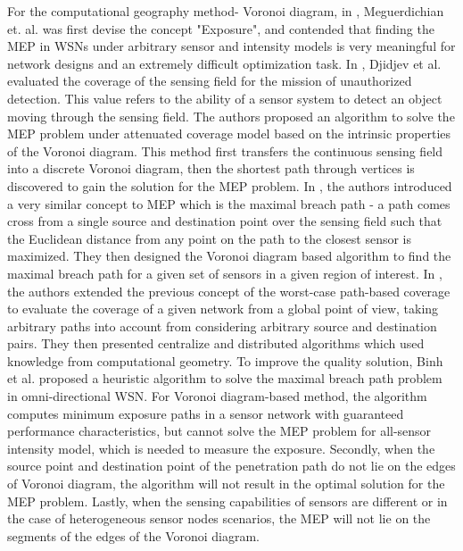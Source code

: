 \documentclass[final]{elsarticle}
\begin{document}
For the computational geography method- Voronoi diagram, in \cite{meguerdichian2001exposure}, Meguerdichian et. al. was first devise the concept "Exposure", and contended that finding the MEP in WSNs under arbitrary sensor and intensity models is very meaningful for network designs and an extremely difficult optimization task. In \cite{djidjev2010approximation}, Djidjev et al. evaluated the coverage of the sensing field for the mission of unauthorized detection. This value refers to the ability of a sensor system to detect an object moving through the sensing field. The authors proposed an algorithm to solve the MEP problem under attenuated coverage model based on the intrinsic properties of the Voronoi diagram. This method first transfers the continuous sensing field into a discrete Voronoi diagram, then the shortest path through vertices is discovered to gain the solution for the MEP problem. In \cite{megerian2005worst}, the authors introduced a very similar concept to MEP which is the maximal breach path - a path comes cross from a single source and destination point over the sensing field such that the Euclidean distance from any point on the path to the closest sensor is maximized. They then designed the Voronoi diagram based algorithm to find the maximal breach path for a given set of sensors in a given region of interest. In \cite{lee2013best}, the authors  extended the previous concept of the worst-case path-based coverage to evaluate the coverage of a given network from a global point of view, taking arbitrary paths into account from considering arbitrary source and destination pairs. They then presented centralize and distributed algorithms which used knowledge from computational geometry. To improve the quality solution, Binh et al. \cite{binh2016heuristic} proposed a heuristic algorithm to solve the maximal breach path problem in omni-directional WSN. For Voronoi diagram-based method, the algorithm computes minimum exposure paths in a sensor network with guaranteed performance
characteristics, but cannot solve the MEP problem for all-sensor intensity model, which is needed to measure the exposure. Secondly,
when the source point and destination point of the penetration
path do not lie on the edges of Voronoi diagram, the algorithm
will not result in the optimal solution for the MEP problem. Lastly,
when the sensing capabilities of sensors are different or in the case of heterogeneous sensor nodes scenarios, the MEP will not lie on the segments of the edges of the Voronoi diagram.
\end{document}
